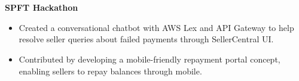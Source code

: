 \newcommand{\contributionItem}[2]{
    \textbf{#1} \\ {#2}
}

\newcommand{\contributionItemListStart}{
    \begin{itemize}
}

\newcommand{\contributionItemListEnd}{
    \end{itemize}
} 

\section{}

\contributionItem{SPFT Hackathon}{
    \contributionItemListStart
        \item Created a conversational chatbot with AWS Lex and API Gateway to help resolve seller queries about failed payments through SellerCentral UI.
        \item Contributed by developing a mobile-friendly repayment portal concept, enabling sellers to repay balances through mobile.
    \contributionItemListEnd}